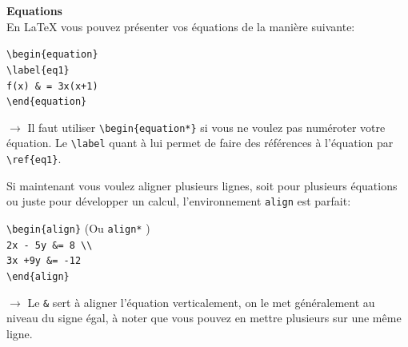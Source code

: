 \documentclass[11pt]{article}				%
\newcommand{\cmd}[2]{\texttt{\textbackslash #1}\texttt{\{#2\}}}
\begin{document}
\textbf{Equations}\\

En LaTeX vous pouvez présenter vos équations de la manière suivante:\\

\begin{multicols}{2}

\cmd{begin}{equation} \\
\cmd{label}{eq1} \\
\verb|f(x) & = 3x(x+1) | \\
\cmd{end}{equation} \\

\columnbreak

$\rightarrow$ Il faut utiliser \cmd{begin}{equation*} si vous ne voulez pas numéroter votre équation. Le \verb|\label| quant à lui permet de faire des références à l'équation par \verb|\ref{eq1}|.

\end{multicols}

Si maintenant vous voulez aligner plusieurs lignes, soit pour plusieurs équations ou juste pour développer un calcul, l'environnement \verb|align| est parfait:

\begin{multicols}{2}

\cmd{begin}{align} \quad (Ou \verb|align*| )\\
\verb|2x - 5y &= 8 \\| \\
\verb|3x +9y &= -12| \\
\cmd{end}{align} \\

\columnbreak

$\rightarrow$ Le \verb|&| sert à aligner l'équation verticalement, on le met généralement au niveau du signe égal, à noter que vous pouvez en mettre plusieurs sur une même ligne.

\end{multicols} 
\end{document}
